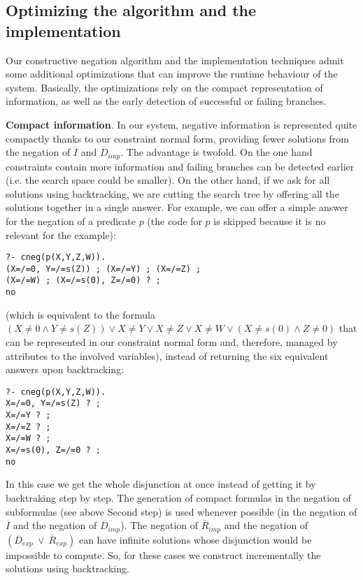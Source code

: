 \documentclass{tlp}
\begin{document}
\vspace{-0.1in}

\subsection{Optimizing the algorithm and the implementation}
\label{optimization}

Our constructive negation algorithm and the implementation techniques
admit some additional optimizations that can improve the runtime
behaviour of the system. Basically, the optimizations rely on the
compact representation of information, as well as the early detection
of successful or failing branches.
\bigskip

\noindent
{\bf Compact information}. In our system, negative information is
represented quite compactly thanks to our constraint normal form,
providing fewer solutions from the negation of $\overline{I}$ and
$\overline{D}_{imp}$. The advantage is twofold. On the one hand
constraints contain more information and failing branches can be
detected earlier (i.e. the search space could be smaller). On the
other hand, if we ask for all solutions using backtracking, we are
cutting the search tree by offering all the solutions together in a
single answer. For example, we can offer a simple answer for the
negation of a predicate $p$ (the code for $p$ is skipped because it is
no relevant for the example): {\small
\begin{verbatim}
?- cneg(p(X,Y,Z,W)).
(X=/=0, Y=/=s(Z)) ; (X=/=Y) ; (X=/=Z) ; 
(X=/=W) ; (X=/=s(0), Z=/=0) ? ;
no
\end{verbatim}
}
\noindent
(which is equivalent to the formula $ (X \neq 0 \wedge Y\neq s(Z))
\vee X \neq Y \vee X \neq Z \vee X \neq W \vee (X \neq s(0) \wedge Z
\neq 0)$ that can be represented in our constraint normal form and,
therefore, managed by attributes to the involved variables), instead
of returning the six equivalent answers upon backtracking: {\small
\begin{verbatim}
?- cneg(p(X,Y,Z,W)).
X=/=0, Y=/=s(Z) ? ;
X=/=Y ? ;
X=/=Z ? ;
X=/=W ? ;
X=/=s(0), Z=/=0 ? ;
no
\end{verbatim}
} 
\noindent
In this case we get the whole disjunction at once instead of getting
it by backtraking step by step. The generation of compact formulas in
the negation of subformulas (see above Second step) is used whenever
possible (in the negation of $\overline{I}$ and the negation of
$\overline{D}_{imp}$). The negation of $\overline{R}_{imp}$ and the
negation of $(\overline{D}_{exp} ~ \vee ~ \overline{R}_{exp})$ can
have infinite solutions whose disjunction would be impossible to
compute. So, for these cases we construct incrementally the solutions
using backtracking.
\bigskip
\end{document}
